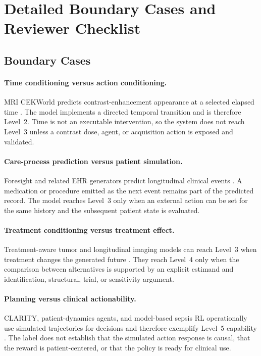 \section{Detailed Boundary Cases and Reviewer Checklist}
\label{app:boundaries}

\subsection{Boundary Cases}

\paragraph{Time conditioning versus action conditioning.} MRI CEKWorld predicts contrast-enhancement appearance at a selected elapsed time \citep{Kong2026MRIContrastEnhancement}. The model implements a directed temporal transition and is therefore Level~2. Time is not an executable intervention, so the system does not reach Level~3 unless a contrast dose, agent, or acquisition action is exposed and validated.

\paragraph{Care-process prediction versus patient simulation.} Foresight and related EHR generators predict longitudinal clinical events \citep{Kraljevi_2024Foresightgenerativepretrained,Waxler2025GenerativeMedicalEvent}. A medication or procedure emitted as the next event remains part of the predicted record. The model reaches Level~3 only when an external action can be set for the same history and the subsequent patient state is evaluated.

\paragraph{Treatment conditioning versus treatment effect.} Treatment-aware tumor and longitudinal imaging models can reach Level~3 when treatment changes the generated future \citep{Yang2025MedicalWorldModel,Liu2025TreatmentawareDiffusion}. They reach Level~4 only when the comparison between alternatives is supported by an explicit estimand and identification, structural, trial, or sensitivity argument.

\paragraph{Planning versus clinical actionability.} CLARITY, patient-dynamics agents, and model-based sepsis RL operationally use simulated trajectories for decisions and therefore exemplify Level~5 capability \citep{Ding2025CLARITYMedicalWorld,Wu2026AgentifyingPatientDynamics,Raghu2018ModelBasedReinforcement}. The label does not establish that the simulated action response is causal, that the reward is patient-centered, or that the policy is ready for clinical use.

